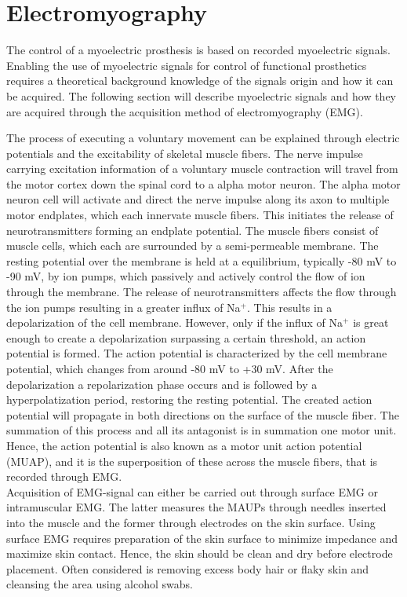 \section{Electromyography}

The control of a myoelectric prosthesis is based on recorded myoelectric signals. \cite{Geethanjali2016}  Enabling the use of myoelectric signals for control of functional prosthetics requires a theoretical background knowledge of the signals origin and how it can be acquired. The following section will describe myoelectric signals and how they are acquired through the acquisition method of electromyography (EMG).      
 
The process of executing a voluntary movement can be explained through electric potentials and the excitability of skeletal muscle fibers. The nerve impulse carrying excitation information of a voluntary muscle contraction will travel from the motor cortex down the spinal cord to a alpha motor neuron. The alpha motor neuron cell will activate and direct the nerve impulse along its axon to multiple motor endplates, which each innervate muscle fibers. \cite{Turker2013} This initiates the release of neurotransmitters forming an endplate potential. The muscle fibers consist of muscle cells, which each are surrounded by a semi-permeable membrane. The resting potential over the membrane is held at a equilibrium, typically -80 mV to -90 mV, by ion pumps, which passively and actively control the flow of ion through the membrane. The release of neurotransmitters affects the flow through the ion pumps resulting in a greater influx of Na$^+$. This results in a depolarization of the cell membrane. However, only if the influx of Na$^+$ is great enough to create a depolarization surpassing a certain threshold, an action potential is formed. The action potential is characterized by the cell membrane potential, which changes from around -80 mV to +30 mV. After the depolarization a repolarization phase occurs and is followed by a hyperpolatization period, restoring the resting potential. The created action potential will propagate in both directions on the surface of the muscle fiber. The summation of this process and all its antagonist is in summation one motor unit. Hence, the action potential is also known as a motor unit action potential (MUAP), and it is the superposition of these across the muscle fibers, that is recorded through EMG. \cite{Turker2013,Martini2012} \\
Acquisition of EMG-signal can either be carried out through surface EMG or intramuscular EMG. The latter measures the MAUPs through needles inserted into the muscle and the former through electrodes on the skin surface. \cite{Cram2012} Using surface EMG requires preparation of the skin surface to minimize impedance and maximize skin contact. Hence, the skin should be clean and dry before electrode placement. Often considered is removing excess body hair or flaky skin and cleansing the area using alcohol swabs. \cite{Turker2013,Cram2012}  

